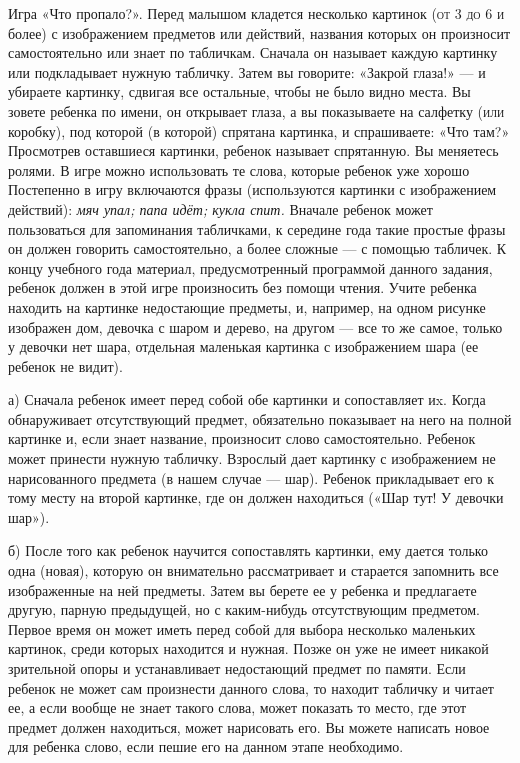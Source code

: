 \documentclass{book}
\renewcommand{\emph}[1]{\textit{#1}}
\begin{document}
Игра «Что пропало?». Перед малышом кладется несколько картинок
\textsc{(от} 3 \textsc{до} 6 \textsc{и} более) с изображением предметов
или действий, названия которых он произносит самостоятельно или знает по
табличкам. Сначала он называет каждую картинку или подкладывает нужную
табличку. Затем вы говорите: «Закрой глаза!» --- и убираете картинку,
сдвигая все остальные, чтобы не было видно места. Вы зовете ребенка по
имени, он открывает глаза, а вы показываете на салфетку \textsc{(или}
коробку), под которой (в которой) спрятана картинка, и спрашиваете: «Что
там?» Просмотрев оставшиеся картинки, ребенок называет спрятанную. Вы
меняетесь ролями. В игре можно использовать те слова, которые ребенок
уже хорошо Постепенно в игру включаются фразы (используются картинки с
изображением действий): \emph{мяч упал; папа идёт; кукла спит.} Вначале
ребенок может пользоваться для запоминания табличками, к середине года
такие простые фразы он должен говорить самостоятельно, а более сложные
--- с помощью табличек. К концу учебного года материал, предусмотренный
программой данного задания, ребенок должен в этой игре произносить без
помощи чтения. Учите ребенка находить на картинке недостающие предметы,
и, например, на одном рисунке изображен дом, девочка с шаром и дерево,
на другом --- все то же самое, только у девочки нет шара, отдельная
маленькая картинка с изображением шара (ее ребенок не видит).

а) Сначала ребенок имеет перед собой обе картинки и сопоставляет иx.
Когда обнаруживает отсутствующий предмет, обязательно показывает на него
на полной картинке и, если знает название, произносит слово
самостоятельно. Ребенок может принести нужную табличку. Взрослый дает
картинку с изображением не нарисованного предмета (в нашем случае ---
шар). Ребенок прикладывает его к тому месту на второй картинке, где он
должен находиться («Шар тут! У девочки шар»).

б) После того как ребенок научится сопоставлять картинки, ему дается
только одна (новая), которую он внимательно рассматривает и старается
запомнить все изображенные на ней предметы. Затем вы берете ее у ребенка
и предлагаете другую, парную предыдущей, но с каким-нибудь отсутствующим
предметом. Первое время он может иметь перед собой для выбора несколько
маленьких картинок, среди которых находится и нужная. Позже он уже не
имеет никакой зрительной опоры и устанавливает недостающий предмет по
памяти. Если ребенок не может сам произнести данного слова, то находит
табличку и читает ее, а если вообще не знает такого слова, может
показать то место, где этот предмет должен находиться, может нарисовать
его. Вы можете написать новое для ребенка слово, если пешие его на
данном этапе необходимо.
\end{document}
